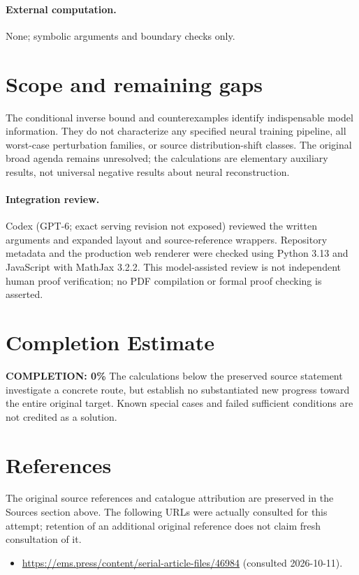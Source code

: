\documentclass[11pt]{article}
\begin{document}
\paragraph{External computation.} None; symbolic arguments and boundary checks only.
\section{Scope and remaining gaps}

The conditional inverse bound and counterexamples identify indispensable model
information. They do not characterize any specified neural training pipeline,
all worst-case perturbation families, or source distribution-shift classes.
The original broad agenda remains unresolved; the calculations are elementary
auxiliary results, not universal negative results about neural reconstruction.

\paragraph{Integration review.} Codex (GPT-6; exact serving revision not exposed) reviewed the written arguments and expanded layout and source-reference wrappers. Repository metadata and the production web renderer were checked using Python 3.13 and JavaScript with MathJax 3.2.2. This model-assisted review is not independent human proof verification; no PDF compilation or formal proof checking is asserted.

\section{Completion Estimate}
\noindent\textbf{COMPLETION: 0\%}
The calculations below the preserved source statement investigate a concrete route,
but establish no substantiated new progress toward the entire original target.
Known special cases and failed sufficient conditions are not credited as a solution.
\section{References}
The original source references and catalogue attribution are preserved in the
Sources section above. The following URLs were actually consulted for this attempt;
retention of an additional original reference does not claim fresh consultation of it.
\begin{itemize}
\item \url{https://ems.press/content/serial-article-files/46984} (consulted 2026-10-11). 
\end{itemize}
\end{document}

